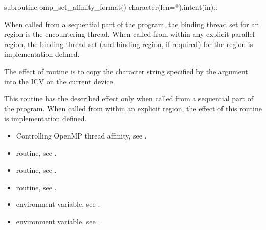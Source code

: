 \begin{fortranspecific}
\begin{ompfSubroutine}
subroutine omp_set_affinity_format()
character(len=*),intent(in)::
\end{ompfSubroutine}
\end{fortranspecific}

\binding
When called from a sequential part of the program, the binding thread 
set for an  region is the encountering 
thread. When called from within any explicit parallel region, the binding 
thread set (and binding region, if required) for the 
 region is implementation defined.

\effect
The effect of  routine is to copy the
character string specified by the  argument into the
 ICV on the current device.

This routine has the described effect only when called from a sequential 
part of the program. When called from within an explicit  
region, the effect of this routine is implementation defined.

\crossreferences
\begin{itemize}
\item Controlling OpenMP thread affinity, see
.

\item {} routine, 
see .

\item {} routine, see .

\item {} routine, see .

\item {} environment variable, see
.

\item {} environment variable, see
.
\end{itemize}

\subsection{}
\label{subsec:omp_get_affinity_format}

